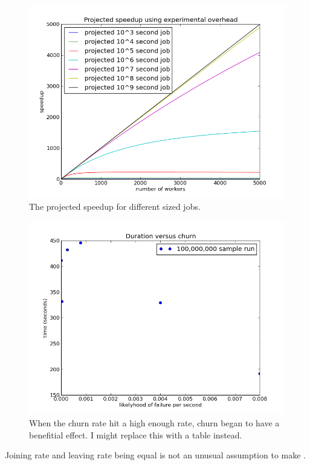 \documentclass[10pt, conference, compsocconf]{IEEEtran}
\begin{document}
\begin{figure}
    \includegraphics[width=\linewidth]{projSpeed}
    \caption{The projected speedup for different sized jobs. }
    \label{projSpeed}
\end{figure}



\begin{figure}
    \includegraphics[width=\linewidth]{churnSpeed}
    \caption{When the churn rate hit a high enough rate, churn began to have a benefitial effect.  I might replace this with a table instead.} 
    \label{churnSpeed}
\end{figure}

Joining rate and leaving rate being equal is not an unusual assumption to make \cite{marozzo2012p2p}.
\end{document}
